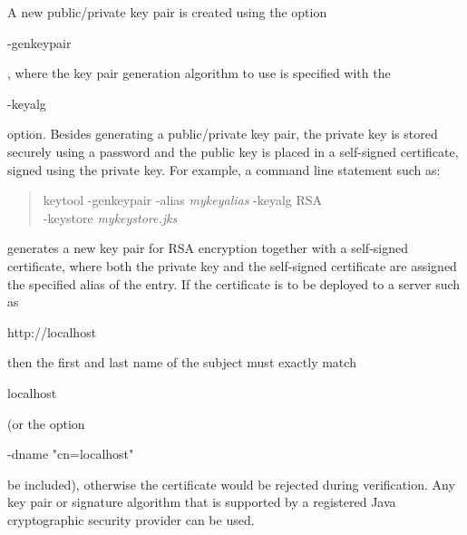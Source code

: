 A new public/private key pair is created using the
option \begin{code}-genkeypair\end{code}, where the key pair
generation algorithm to use is specified with the \begin{code}-keyalg\end{code} option.
Besides generating a public/private key pair, the private key is stored securely using
a password and the public key is placed in a self-signed certificate,
signed using the private key.
For example, a command line statement such as:
\begin{quote}\begin{code}
keytool -genkeypair -alias \emph{mykeyalias} -keyalg RSA \\
\trind  -keystore \emph{mykeystore.jks}
\end{code}\end{quote}
generates a new key pair for RSA encryption together with a self-signed certificate,
where both the private key and the self-signed certificate are assigned the specified alias
of the entry.
If the certificate is to be deployed to a server such as \begin{code}http://localhost\end{code}
then the first and last name of the subject must exactly match \begin{code}localhost\end{code}
(or the option \begin{code}-dname "cn=localhost"\end{code} be included),
otherwise the certificate would be rejected during verification.
Any key pair or signature algorithm that is supported by a registered
Java cryptographic security provider can be used.

